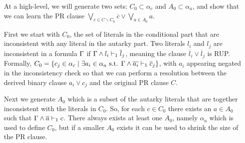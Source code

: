 At a high-level, we will generate two sets: $C_0 \subset \alpha_c$ and $A_0 \subset \alpha_a$, 
and show that we can learn the PR clause $\bigvee_{c \in C \backslash C_0} \overline{c} \lor
\bigvee_{a \in A_0} a$. 

First we start with $C_0$, the set of literals in the conditional part that are inconsistent with any literal in the autarky part.
Two literals $l_i$ and $l_j$ are inconsistent in a formula $\Gamma$ if  $\Gamma \land l_i \vdash_1 \overline{l}_j$, meaning the clause $\overline{l}_i \lor \overline{l}_j$ is RUP. 
Formally, $C_0 = \{c_j \in \alpha_c \mid \exists a_i \in
\alpha_a \text{ s.t. } \Gamma \land \overline{a_i} \vdash_1 \overline{c}_j \}$, with $a_i$ appearing negated in the inconsistency check so that we can perform a resolution between the derived binary clause  $a_i \lor c_j$ and the original PR clause $C$.

Next we generate $A_0$ which is a subset of the autarky literals that are together inconsistent with the literals in $C_0$. 
So, for each $c \in C_0$ there exists an $a \in A_0$ such that $\Gamma \land \overline{a} \vdash_1 c$. 
There always exists at least one $A_0$, namely $\alpha_a$ which is used to define $C_0$, 
but if a smaller $A_0$ exists it can be used to shrink the size of the PR clause. 


%
%
%
%
%
%
%


